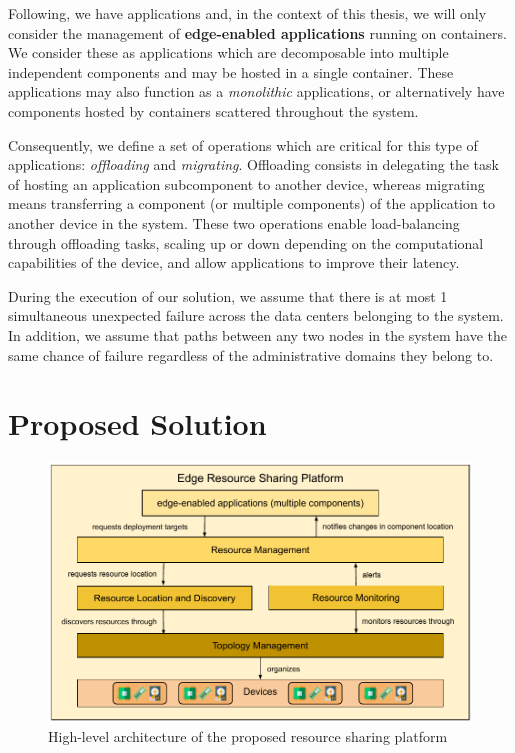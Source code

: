 Following, we have applications and, in the context of this thesis, we will only consider the management of \textbf{edge-enabled applications} running on containers. We consider these as applications which are decomposable into  multiple independent components and may be hosted in a single container. These applications may also function as a \textit{monolithic} applications, or alternatively have components hosted by containers scattered throughout the system.

Consequently, we define a set of operations which are critical for this type of applications: \textit{offloading} and \textit{migrating}. Offloading consists in delegating the task of hosting an application subcomponent to another device, whereas migrating means transferring a component (or multiple components) of the application to another device in the system. These two operations enable load-balancing through offloading tasks, scaling up or down depending on the computational capabilities of the device, and allow applications to improve their latency. 


During the execution of our solution, we assume that there is at most 1 simultaneous unexpected failure across the data centers belonging to the system. In addition, we assume that paths between any two nodes in the system have the same chance of failure regardless of the administrative domains they belong to.

\section{Proposed Solution}
\label{cha:proposed_sol}


\begin{figure}
    \centering
    \includegraphics[width=0.9\linewidth]{Figures/proposed_architecture_detailed.pdf}
    \caption{High-level architecture of the proposed resource sharing platform}
    \label{fig:proposed_architecture_detailed}
\end{figure}

